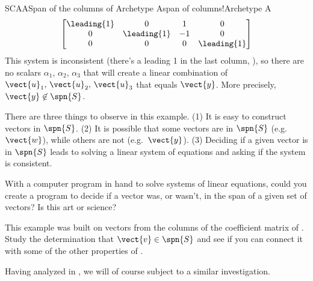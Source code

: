 \begin{example}{SCAA}{Span of the columns of Archetype A}{span of columns!Archetype A}
\begin{align*}
%
\begin{bmatrix}
\leading{1} & 0 & 1 & 0\\ 
0 & \leading{1} & -1 & 0\\ 
0 & 0 & 0 & \leading{1}
\end{bmatrix}
\end{align*}
%
This system is inconsistent (there's a leading 1 in the last column, ), so there are no scalars $\alpha_1,\,\alpha_2,\,\alpha_3$ that will create a linear combination of $\vect{u}_1,\,\vect{u}_2,\,\vect{u}_3$ that equals $\vect{y}$.  More precisely, $\vect{y}\not\in\spn{S}$.\par
%
There are three things to observe in this example.  (1) It is easy to construct vectors in $\spn{S}$.  (2) It is possible that some vectors are in $\spn{S}$ (e.g.\ $\vect{w}$), while others are not (e.g.\ $\vect{y}$).  (3)  Deciding if a given vector is in $\spn{S}$ leads to solving a linear system of equations and asking if the system is consistent.\par
%
With a computer program in hand to solve systems of linear equations, could you create a program to decide if a vector was, or wasn't, in the span of a given set of vectors?  Is this art or science?\par
%
This example was built on vectors from the columns of the coefficient matrix of .  Study the determination that $\vect{v}\in\spn{S}$ and see if you can connect it with some of the other properties of .
%
\end{example}
%
Having analyzed  in , we will of course subject  to a similar investigation.
%
%
